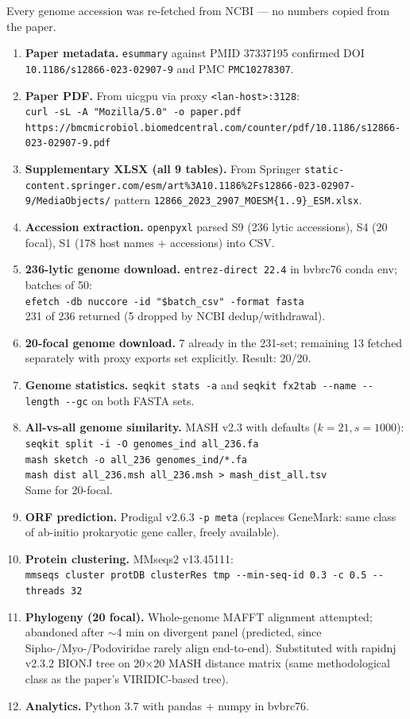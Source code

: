 \documentclass[11pt]{article}
\begin{document}
Every genome accession was re-fetched from NCBI --- no numbers copied from the paper.

\begin{enumerate}
\item \textbf{Paper metadata.} \verb|esummary| against PMID 37337195 confirmed DOI \texttt{10.1186/s12866-023-02907-9} and PMC \texttt{PMC10278307}.
\item \textbf{Paper PDF.} From uicgpu via proxy \texttt{<lan-host>:3128}:\\
\verb|curl -sL -A "Mozilla/5.0" -o paper.pdf|\\
\verb|https://bmcmicrobiol.biomedcentral.com/counter/pdf/10.1186/s12866-023-02907-9.pdf|
\item \textbf{Supplementary XLSX (all 9 tables).} From Springer \texttt{static-content.springer.com/esm/art\%3A10.1186\%2Fs12866-023-02907-9/MediaObjects/} pattern \texttt{12866\_2023\_2907\_MOESM\{1..9\}\_ESM.xlsx}.
\item \textbf{Accession extraction.} \texttt{openpyxl} parsed S9 (236 lytic accessions), S4 (20 focal), S1 (178 host names + accessions) into CSV.
\item \textbf{236-lytic genome download.} \texttt{entrez-direct 22.4} in bvbrc76 conda env; batches of 50: \\
\verb|efetch -db nuccore -id "$batch_csv" -format fasta|\\
231 of 236 returned (5 dropped by NCBI dedup/withdrawal).
\item \textbf{20-focal genome download.} 7 already in the 231-set; remaining 13 fetched separately with proxy exports set explicitly. Result: 20/20.
\item \textbf{Genome statistics.} \verb|seqkit stats -a| and \verb|seqkit fx2tab --name --length --gc| on both FASTA sets.
\item \textbf{All-vs-all genome similarity.} MASH v2.3 with defaults ($k=21, s=1000$):\\
\verb|seqkit split -i -O genomes_ind all_236.fa|\\
\verb|mash sketch -o all_236 genomes_ind/*.fa|\\
\verb|mash dist all_236.msh all_236.msh > mash_dist_all.tsv|\\
Same for 20-focal.
\item \textbf{ORF prediction.} Prodigal v2.6.3 \verb|-p meta| (replaces GeneMark: same class of ab-initio prokaryotic gene caller, freely available).
\item \textbf{Protein clustering.} MMseqs2 v13.45111:\\
\verb|mmseqs cluster protDB clusterRes tmp --min-seq-id 0.3 -c 0.5 --threads 32|
\item \textbf{Phylogeny (20 focal).} Whole-genome MAFFT alignment attempted; abandoned after $\sim$4 min on divergent panel (predicted, since Sipho-/Myo-/Podoviridae rarely align end-to-end). Substituted with rapidnj v2.3.2 BIONJ tree on 20$\times$20 MASH distance matrix (same methodological class as the paper's VIRIDIC-based tree).
\item \textbf{Analytics.} Python 3.7 with pandas + numpy in bvbrc76.
\end{enumerate}
\end{document}
